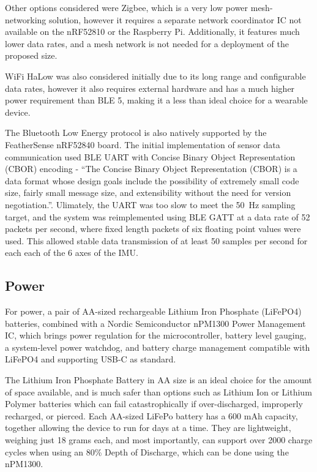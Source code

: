 \documentclass[conference]{IEEEtran}
\begin{document}
Other options considered were Zigbee, which is a very low power mesh-networking solution, however it requires a separate network coordinator IC not available on the nRF52810 or the Raspberry Pi. Additionally, it features much lower data rates, and a mesh network is not needed for a deployment of the proposed size.

WiFi HaLow was also considered initially due to its long range and configurable data rates, however it also requires external hardware and has a much higher power requirement than BLE 5, making it a less than ideal choice for a wearable device.

The Bluetooth Low Energy protocol is also natively supported by the FeatherSense nRF52840 board. The initial implementation of sensor data communication used BLE UART with Concise Binary Object Representation (CBOR) encoding - ``The Concise Binary Object Representation (CBOR) is a data format whose design goals include the possibility of extremely small code size, fairly small message size, and extensibility without the need for version negotiation.''\cite{cbor}. Ulimately, the UART was too slow to meet the 50~Hz sampling target, and the system was reimplemented using BLE GATT at a data rate of 52 packets per second, where fixed length packets of six floating point values were used. This allowed stable data transmission of at least 50 samples per second for each each of the 6 axes of the IMU.

\subsection{Power}

For power, a pair of AA-sized rechargeable Lithium Iron Phosphate (LiFePO4) batteries, combined with a Nordic Semiconductor nPM1300 Power Management IC, which brings power regulation for the microcontroller, battery level gauging, a system-level power watchdog, and battery charge management compatible with LiFePO4 and supporting USB-C as standard.

The Lithium Iron Phosphate Battery in AA size is an ideal choice for the amount of space available, and is much safer than options such as Lithium Ion or Lithium Polymer batteries which can fail catastrophically if over-discharged, improperly recharged, or pierced. Each AA-sized LiFePo battery has a 600 mAh capacity, together allowing the device to run for days at a time. They are lightweight, weighing just 18 grams each, and most importantly, can support over 2000 charge cycles when using an 80\% Depth of Discharge, which can be done using the nPM1300. 
\end{document}
